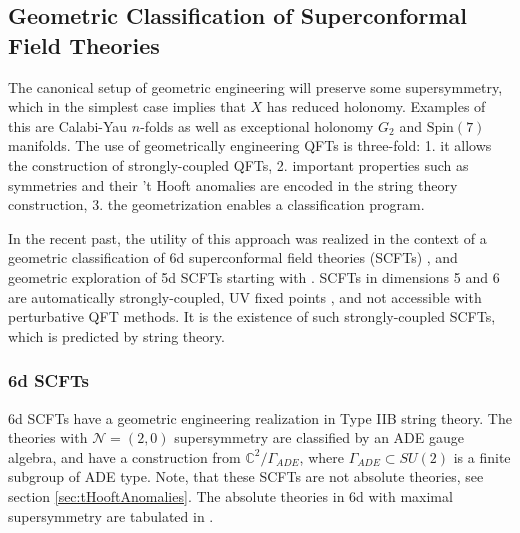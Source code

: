 \documentclass[12pt]{article}
\begin{document}
\subsection{Geometric Classification of Superconformal Field Theories}
\label{sec:GeoSCFT}

The canonical setup of geometric engineering will preserve some supersymmetry, which in the simplest case implies that $X$ has reduced holonomy. Examples of this are 
Calabi-Yau $n$-folds as well as exceptional holonomy $G_2$ and $\text{Spin}(7)$ manifolds. 
The use of geometrically engineering QFTs is three-fold: 
1. it allows the construction of strongly-coupled QFTs, 2. important properties such as symmetries and their 't Hooft anomalies are encoded in the string theory construction, 3. the geometrization enables a classification program. 

In the recent past, the utility of this approach was realized in the context of a geometric classification of 6d superconformal field theories (SCFTs) \cite{Heckman:2013pva,Heckman:2015bfa, Bhardwaj:2015xxa}, and geometric exploration of 5d SCFTs starting with \cite{Jefferson:2017ahm, Jefferson:2018irk, Bhardwaj:2018yhy,Bhardwaj:2018vuu, Apruzzi:2019enx, Apruzzi:2019opn, Apruzzi:2019vpe, Bhardwaj:2019fzv}. SCFTs in dimensions 5 and 6 are automatically strongly-coupled, UV fixed points \cite{Seiberg:1996bd, Morrison:1996xf}, and not accessible with perturbative QFT methods. It is the existence of such strongly-coupled SCFTs, which is predicted by string theory. 

\subsubsection{6d SCFTs}
6d SCFTs have a geometric engineering realization in Type IIB string theory. The theories with $\mathcal{N}=(2,0)$ supersymmetry are classified by an ADE gauge algebra, and have a construction from $\mathbb{C}^2/\Gamma_{ADE}$, where $\Gamma_{ADE} \subset SU(2)$ is a finite subgroup of ADE type. 
Note, that these SCFTs are not absolute theories, see section \ref{sec:tHooftAnomalies}. The absolute theories in 6d with maximal supersymmetry are tabulated in \cite{Gukov:2020btk}. 
\end{document}
